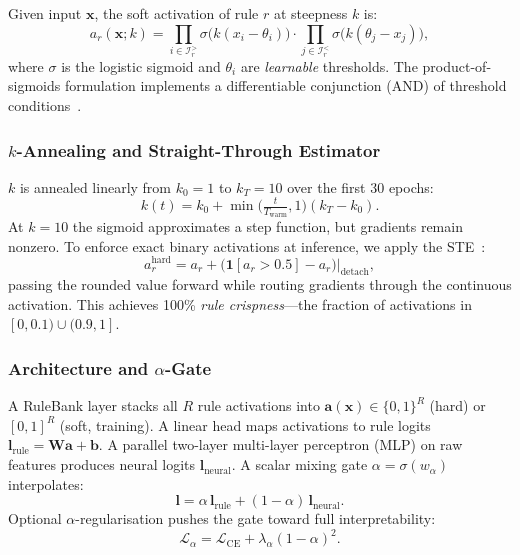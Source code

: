 \documentclass[conference]{IEEEtran}
\begin{document}
Given input $\mathbf{x}$, the soft activation of rule $r$ at steepness $k$
is:
\begin{equation}
  a_r(\mathbf{x};k) =
    \prod_{i\in\mathcal{I}_r^{>}}\!\sigma\!\bigl(k(x_i{-}\theta_i)\bigr)\cdot
    \prod_{j\in\mathcal{I}_r^{<}}\!\sigma\!\bigl(k(\theta_j{-}x_j)\bigr),
  \label{eq:rule_score}
\end{equation}
where $\sigma$ is the logistic sigmoid and $\theta_i$ are \emph{learnable}
thresholds. The product-of-sigmoids formulation implements a differentiable
conjunction (AND) of threshold conditions~\cite{petersen2022logic,yang2022ste}.

\subsubsection{$k$-Annealing and Straight-Through Estimator}

$k$ is annealed linearly from $k_0{=}1$ to $k_T{=}10$ over the first 30 epochs:
\begin{equation}
  k(t) = k_0 + \min\!\bigl(\tfrac{t}{T_{\mathrm{warm}}},1\bigr)(k_T{-}k_0).
\end{equation}
At $k{=}10$ the sigmoid approximates a step function, but gradients remain
nonzero.
To enforce exact binary activations at inference, we apply the
STE~\cite{bengio2013ste,liu2023reinmax}:
\begin{equation}
  a_r^{\mathrm{hard}} = a_r + \bigl(\mathbf{1}[a_r{>}0.5] - a_r\bigr)
    \big|_{\mathrm{detach}},
  \label{eq:ste}
\end{equation}
passing the rounded value forward while routing gradients through the
continuous activation. This achieves 100\% \emph{rule crispness}---the
fraction of activations in $[0,0.1)\cup(0.9,1]$.

\subsubsection{Architecture and $\alpha$-Gate}

A RuleBank layer stacks all $R$ rule activations into
$\mathbf{a}(\mathbf{x})\in\{0,1\}^R$ (hard) or $[0,1]^R$ (soft, training).
A linear head maps activations to rule logits
$\mathbf{l}_{\mathrm{rule}}{=}\mathbf{W}\mathbf{a}{+}\mathbf{b}$.
A parallel two-layer multi-layer perceptron (MLP) on raw features
produces neural logits $\mathbf{l}_{\mathrm{neural}}$.
A scalar mixing gate $\alpha{=}\sigma(w_\alpha)$ interpolates:
\begin{equation}
  \mathbf{l} = \alpha\,\mathbf{l}_{\mathrm{rule}} +
               (1{-}\alpha)\,\mathbf{l}_{\mathrm{neural}}.
\end{equation}
Optional $\alpha$-regularisation pushes the gate toward full interpretability:
\begin{equation}
  \mathcal{L}_\alpha = \mathcal{L}_{\mathrm{CE}} + \lambda_\alpha(1{-}\alpha)^2.
  \label{eq:alpha_reg}
\end{equation}
\end{document}
